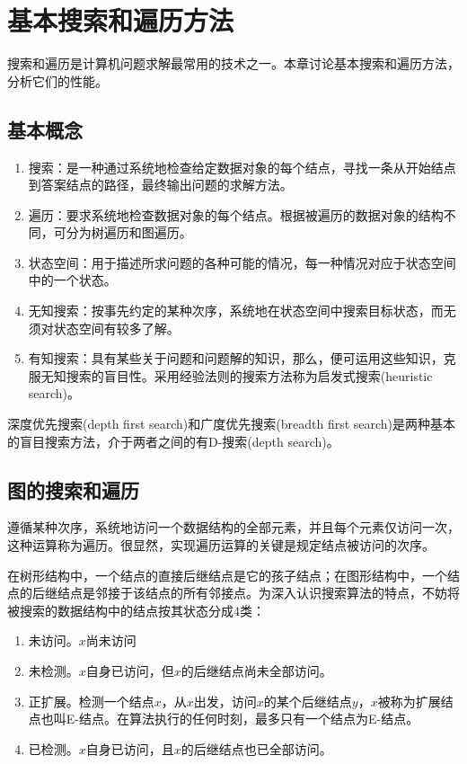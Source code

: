 \section{基本搜索和遍历方法}
搜索和遍历是计算机问题求解最常用的技术之一。本章讨论基本搜索和遍历方法，分析它们的性能。
\subsection*{基本概念}

\begin{enumerate}
	\item 搜索：是一种通过系统地检查给定数据对象的每个结点，寻找一条从开始结点到答案结点的路径，最终输出问题的求解方法。
	\item 遍历：要求系统地检查数据对象的每个结点。根据被遍历的数据对象的结构不同，可分为树遍历和图遍历。
	\item 状态空间：用于描述所求问题的各种可能的情况，每一种情况对应于状态空间中的一个状态。
	\item 无知搜索：按事先约定的某种次序，系统地在状态空间中搜索目标状态，而无须对状态空间有较多了解。
	\item 有知搜索：具有某些关于问题和问题解的知识，那么，便可运用这些知识，克服无知搜索的盲目性。采用经验法则的搜索方法称为启发式搜索(heuristic search)。
\end{enumerate}

深度优先搜索(depth first search)和广度优先搜索(breadth first search)是两种基本的盲目搜索方法，介于两者之间的有D-搜索(depth search)。
\subsection*{图的搜索和遍历} 
遵循某种次序，系统地访问一个数据结构的全部元素，并且每个元素仅访问一次，这种运算称为遍历。很显然，实现遍历运算的关键是规定结点被访问的次序。

在树形结构中，一个结点的直接后继结点是它的孩子结点；在图形结构中，一个结点的后继结点是邻接于该结点的所有邻接点。为深入认识搜索算法的特点，不妨将被搜索的数据结构中的结点按其状态分成4类：
\begin{enumerate}
	\item 未访问。$x$尚未访问
	\item 未检测。$x$自身已访问，但$x$的后继结点尚未全部访问。
	\item 正扩展。检测一个结点$x$，从$x$出发，访问$x$的某个后继结点$y$，$x$被称为扩展结点也叫E-结点。在算法执行的任何时刻，最多只有一个结点为E-结点。
	\item 已检测。$x$自身已访问，且$x$的后继结点也已全部访问。
\end{enumerate}

